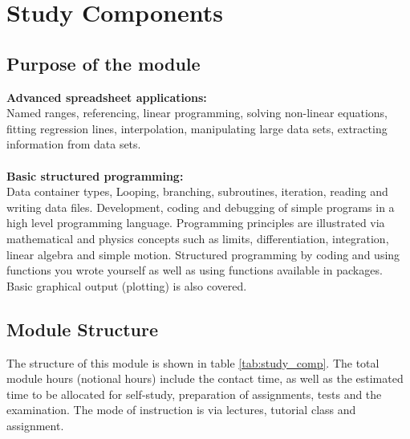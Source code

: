 \section{Study Components}
    \subsection{Purpose of the module}
    {\bf Advanced spreadsheet applications:} \\
    Named ranges, referencing, linear programming, solving non-linear
    equations, fitting regression lines, interpolation, manipulating
    large data sets, extracting information from data sets. \\ \\
    {\bf Basic structured programming:} \\
    Data container types, Looping, branching, subroutines, iteration,
    reading and writing data files. Development, coding and debugging
    of simple programs in a high level programming
    language. Programming principles are illustrated via mathematical
    and physics concepts such as limits, differentiation, integration,
    linear algebra and simple motion. Structured programming by coding
    and using functions you wrote yourself as well as using functions
    available in packages. Basic graphical output (plotting) is also
    covered.

    \subsection{Module Structure}
        The structure of this module is shown in table \ref{tab:study_comp}.
        The total module hours (notional hours) include the contact time,
        as well as the estimated time to be allocated for self-study,
        preparation of assignments, tests and the examination. The mode of
        instruction is via lectures, tutorial class and assignment. \\

